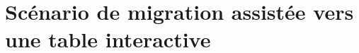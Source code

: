 \documentclass{article}
\begin{document}
{}

\label{resume}

\chapter{Scénario de migration assistée vers une table interactive}
\label{chap1}





\end{document}
